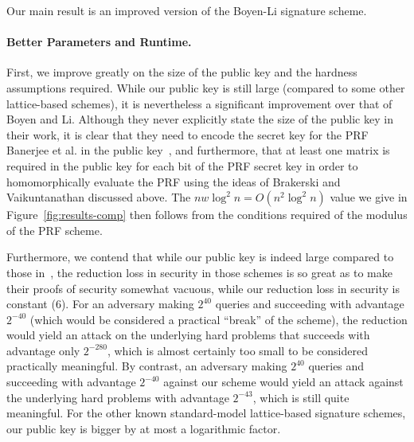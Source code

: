 Our main result is an improved version of the Boyen-Li signature scheme.













\paragraph{Better Parameters and Runtime.} First, we improve greatly on the size of the public key and the hardness assumptions required.  While our public key is still large (compared to some other lattice-based schemes), it is nevertheless a significant improvement over that of Boyen and Li. Although they never explicitly state the size of the public key in their work, it is clear that they need to encode the secret key for the PRF Banerjee et al. in the public key~\cite{DBLP:conf/eurocrypt/BanerjeePR12}, and furthermore, that at least one matrix is required in the public key for each bit of the PRF secret key in order to homomorphically evaluate the PRF using the ideas of Brakerski and Vaikuntanathan discussed above. The $nw\log^2{n}=O(n^2\log^2{n})$ value we give in Figure~\ref{fig:results-comp} then follows from the conditions required of the modulus of the PRF scheme. 


Furthermore, we contend that while our public key is indeed large compared to those in~\cite{DBLP:conf/crypto/DucasM14,DBLP:conf/pkc/Alperin-Sheriff15}, the reduction loss in security in those schemes is so great as to make their proofs of security somewhat vacuous, while our reduction loss in security is constant ($6$). For an adversary making $2^{40}$ queries and succeeding with advantage $2^{-40}$ (which would be considered a practical ``break'' of the scheme), the reduction would yield an attack on the underlying hard problems that succeeds with advantage only $2^{-280}$, which is almost certainly too small to be considered practically meaningful. By contrast, an adversary making $2^{40}$ queries and succeeding with advantage $2^{-40}$ against our scheme would yield an attack against the underlying hard problems with advantage $2^{-43}$, which is still quite meaningful. For the other known standard-model lattice-based signature schemes, our public key is bigger by at most a logarithmic factor. 



